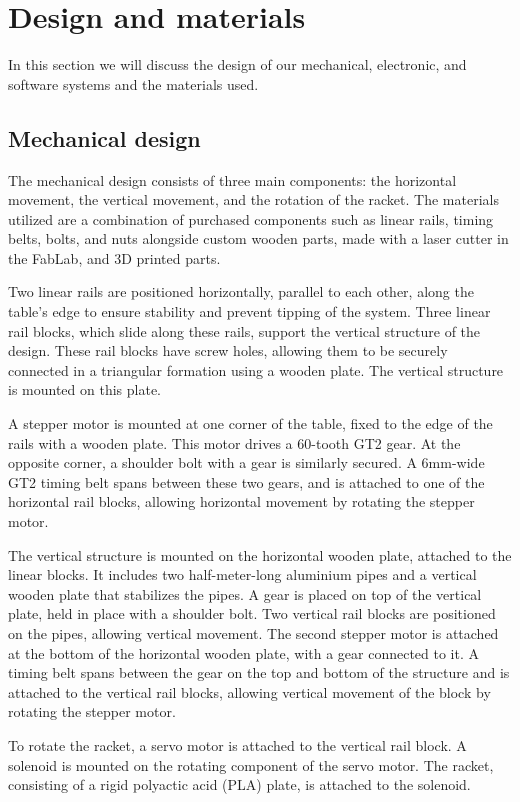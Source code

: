 \chapter{Design and materials}
In this section we will discuss the design of our mechanical, electronic, and software systems and the materials used.

\section{Mechanical design}
The mechanical design consists of three main components: the horizontal movement,  the vertical movement,  and the rotation of the racket. 
The materials utilized are a combination of purchased components such as linear rails, timing belts, bolts, and nuts alongside custom wooden parts, made with a laser cutter in the FabLab, and 3D printed parts.

Two linear rails are positioned horizontally, parallel to each other, along the table's edge to ensure stability and prevent tipping of the system. Three linear rail blocks, which slide along these rails, support the vertical structure of the design. These rail blocks have screw holes, allowing them to be securely connected in a triangular formation using a wooden plate. The vertical structure is mounted on this plate.

A stepper motor is mounted at one corner of the table, fixed to the edge of the rails with a wooden plate. This motor drives a 60-tooth GT2 gear. At the opposite corner, a shoulder bolt with a gear is similarly secured. A 6mm-wide GT2 timing belt spans between these two gears, and is attached to one of the horizontal rail blocks, allowing horizontal movement by rotating the stepper motor.

The vertical structure is mounted on the horizontal wooden plate, attached to the linear blocks. It includes two half-meter-long aluminium pipes and a vertical wooden plate that stabilizes the pipes. A gear is placed on top of the vertical plate, held in place with a shoulder bolt. Two vertical rail blocks are positioned on the pipes, allowing vertical movement. The second stepper motor is attached at the bottom of the horizontal wooden plate, with a gear connected to it. A timing belt spans between the gear on the top and bottom of the structure and is attached to the vertical rail blocks, allowing vertical movement of the block by rotating the stepper motor.

To rotate the racket, a servo motor is attached to the vertical rail block. A solenoid is mounted on the rotating component of the servo motor. The racket, consisting of a rigid polyactic acid (PLA) plate, is attached to the solenoid.

